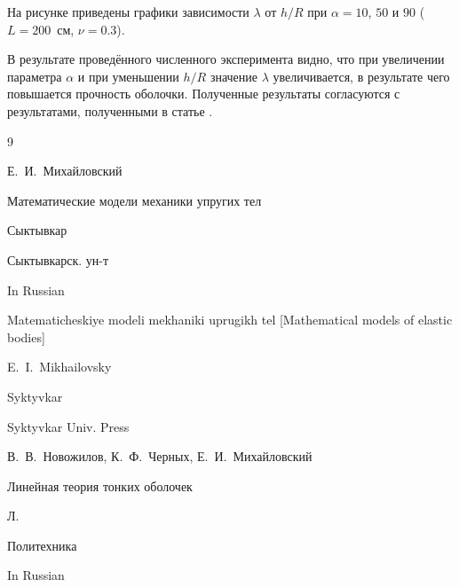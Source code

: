 На рисунке приведены графики зависимости $\lambda$ от $h/R$ при $\alpha=10$, $50$ и $90$ ($L=200$~см, $\nu=0.3$).



\smallskip




В результате проведённого численного эксперимента видно, что при увеличении параметра $\alpha$ и при уменьшении $h/R$  значение $\lambda$ увеличивается, в результате чего повышается прочность оболочки. Полученные результаты согласуются с результатами, полученными в статье \cite{kor:bib:6}.







\begin{thebibliography}{9}




\by Е.~И.~Михайловский

\book Математические модели механики упругих тел

\publaddr Сыктывкар

\publ Сыктывкарск. ун-т



\misctransl

\lang In Russian

\book Matematicheskiye modeli mekhaniki uprugikh tel \rm [Mathematical models of elastic bodies]



\by E.~I.~Mikhailovsky

\publaddr Syktyvkar

\publ Syktyvkar Univ. Press






\by В.~В.~Новожилов, К.~Ф.~Черных, Е.~И.~Михайловский

\book Линейная теория тонких оболочек

\publaddr Л.

\publ Политехника



\misctransl

\lang In Russian


\end{thebibliography}
